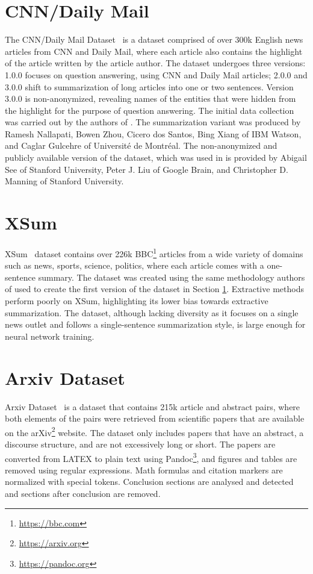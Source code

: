 \documentclass[english, ba, kiv, he, iso690numb, pdf, viewonly]{fasthesis}
\begin{document}
\section{CNN/Daily Mail}\label{cnn/dm}
The CNN/Daily Mail Dataset~\cite{HermannKGEKSB15} is a dataset comprised of over 300k English news articles from CNN and Daily Mail, where each article also contains the highlight of the article written by the article author. The dataset undergoes three versions: 1.0.0 focuses on question answering, using CNN and Daily Mail articles; 2.0.0 and 3.0.0 shift to summarization of long articles into one or two sentences. Version 3.0.0 is non-anonymized, revealing names of the entities that were hidden from the highlight for the purpose of question answering. The initial data collection was carried out by the authors of \cite{HermannKGEKSB15}. The summarization variant was produced by Ramesh Nallapati, Bowen Zhou, Cicero dos Santos, Bing Xiang of IBM Watson, and Caglar Gulcehre of Université de Montréal. The non-anonymized and publicly available version of the dataset, which was used in \cite{see-etal-2017-get} is provided by Abigail See of Stanford University, Peter J. Liu of Google Brain, and Christopher D. Manning of Stanford University. 

\section{XSum} \label{sec:xsum}
XSum~\cite{xsum-emnlp} dataset contains over 226k BBC\footnote{\url{https://bbc.com}} articles from a wide variety of domains such as news, sports, science, politics, where each article comes with a one-sentence summary. The dataset was created using the same methodology authors of \cite{HermannKGEKSB15} used to create the first version of the dataset in Section \ref{cnn/dm}. Extractive methods perform poorly on XSum, highlighting its lower bias towards extractive summarization. The dataset, although lacking diversity as it focuses on a single news outlet and follows a single-sentence summarization style, is large enough for neural network training.

\section{Arxiv Dataset}
Arxiv Dataset~\cite{cohan2018discourseaware} is a dataset that contains 215k article and abstract pairs, where both elements of the pairs were retrieved from scientific papers that are available on the arXiv\footnote{\url{https://arxiv.org}} website. The dataset only includes papers that have an abstract, a discourse structure, and are not excessively long or short. The papers are converted from LATEX to plain text using Pandoc\footnote{\url{https://pandoc.org}}, and figures and tables are removed using regular expressions. Math formulas and citation markers are normalized with special tokens. Conclusion sections are analysed and detected and sections after conclusion are removed.
\end{document}
